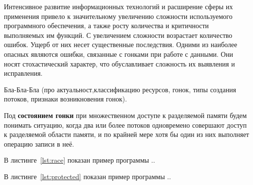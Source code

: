 \Introduction

Интенсивное развитие информационных технологий и расширение сферы их применения привело к значительному увеличению сложности используемого программного обеспечения, а также росту количества и критичности выполняемых им функций. С увеличением сложности возрастает количество ошибок. Ущерб от них несет существенные последствия. Одними из наиболее опасных являются ошибки, связанные с гонками при работе с данными. Они носят стохастический характер, что обуславливает сложность их выявления и исправления.

Бла-Бла-Бла (про актуальност,классификацию ресурсов, гонок, типы создания  потоков, признаки возникновения гонок).

Под \textbf{состоянием гонки} при множественном доступе к разделяемой памяти будем понимать ситуацию, когда два или более потоков одновремено совершают доступ к разделяемой области памяти, и по крайней мере хотя бы один из них выполняет операцию записи в неё. 





В листинге~\ref{lst:race} показан пример программы ..

В листинге~\ref{lst:protected} показан пример программы ..
